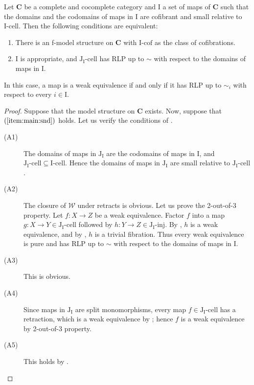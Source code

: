 \documentclass{amsart}
\theoremstyle{definition}
\newcommand{\we}{\mathcal{W}}
\newcommand{\cat}[1]{\mathbf{#1}}
\newcommand{\C}{\cat{C}}
\newcommand{\I}{\mathrm{I}}
\newcommand{\J}{\mathrm{J}}
\newcommand{\class}[2]{#1\text{-}\mathrm{#2}}
\newcommand{\Iinj}[1][\I]{\class{#1}{inj}}
\newcommand{\Icell}[1][\I]{\class{#1}{cell}}
\newcommand{\Icof}[1][\I]{\class{#1}{cof}}
\newcommand{\Jinj}[1][]{\Iinj[\J#1]}
\newcommand{\Jcell}[1][]{\Icell[\J#1]}
\begin{document}
\begin{thm}[main]
Let $\C$ be a complete and cocomplete category and $\I$ a set of maps of $\C$ such that
the domains and the codomains of maps in $\I$ are cofibrant and small relative to $\Icell$.
Then the following conditions are equivalent:
\begin{enumerate}
\item There is an f-model structure on $\C$ with $\Icof$ as the class of cofibrations.
\item \label{item:main:snd} $\I$ is appropriate, and $\Jcell[_\I]$ has RLP up to $\sim$ with respect to the domains of maps in $\I$.
\end{enumerate}
In this case, a map is a weak equivalence if and only if it has RLP up to $\sim_i$ with respect to every $i \in \I$.
\end{thm}
\begin{proof}
Suppose that the model structure on $\C$ exists.
Now, suppose that $(\ref{item:main:snd})$ holds.
Let us verify the conditions of .
\begin{description}
\item[(A1)] The domains of maps in $\J_\I$ are the codomains of maps in $\I$, and $\Jcell[_\I] \subseteq \Icell$.
Hence the domains of maps in $\J_\I$ are small relative to $\Jcell[_\I]$.
\item[(A2)] The closure of $\we$ under retracts is obvious.
Let us prove the 2-out-of-3 property.
Let $f : X \to Z$ be a weak equivalence.
Factor $f$ into a map $g : X \to Y \in \Jcell[_\I]$ followed by $h : Y \to Z \in \Jinj[_\I]$.
By , $h$ is a weak equivalence, and by , $h$ is a trivial fibration.
Thus every weak equivalence is pure and has RLP up to $\sim$ with respect to the domains of maps in $\I$.
\item[(A3)] This is obvious.
\item[(A4)] Since maps in $\J_\I$ are split monomorphisms, every map
$f \in \Jcell[_\I]$ has a retraction, which is a weak equivalence by
; hence $f$ is a weak equivalence by 2-out-of-3 property.
\item[(A5)] This holds by .
\end{description}
\end{proof}
\end{document}
